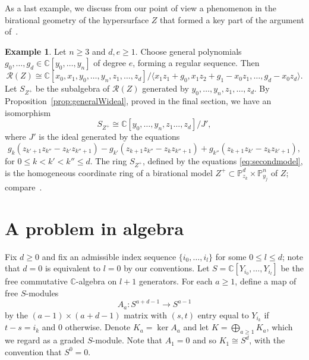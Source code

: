 \documentclass[a4paper,11pt]{amsart}
\theoremstyle{plain}
\theoremstyle{definition}
\newtheorem{example}[theorem]{Example}
\newcommand{\C}{\mathbb{C}}
\newcommand{\p}{\mathbb{P}}
\newcommand{\R}{\mathcal{R}}
\newcommand{\balazs}[1]{{\color{blue} [#1]}}
\begin{document}
As a last example, we discuss from our point of view a phenomenon in the birational geometry of the hypersurface $Z$ that formed a key part of the argument of~\cite{ottem}.

\begin{example}\label{ex:regcasemodel}
    Let $n \geq 3$ and $d,e \geq 1$. Choose general polynomials $g_0,\dots,g_d \in \C[y_0,\dots,y_n]$ of degree $e$, forming a regular sequence. Then
    \[
    \R(Z) \cong \C[x_0,x_1,y_0,\dots,y_n,z_1,\dots,z_d]/\langle x_1 z_1 + g_0, x_1 z_2 + g_1 - x_0 z_1,\ldots, g_d - x_0 z_d\rangle.
    \]
    Let $S_{Z^+}$ be the subalgebra of $\R(Z)$ generated by $y_0,\dots,y_n,z_1,\dots,z_d$. By Proposition~\ref{prop:generalWideal}, proved in the final section, we have an isomorphism
    \[
    S_{Z^+} \cong \C[y_0,\dots,y_n,z_1\dots,z_d]/J',
    \]
    where $J'$ is the ideal generated by the equations
    \begin{equation} \label{eq:secondmodel}
     g_{k} (z_{k'+1} z_{k''} - z_{k'} z_{k''+1}) - g_{k'} (z_{k+1} z_{k''} - z_k z_{k''+1}) + g_{k''} (z_{k+1} z_{k'} - z_k z_{k'+1}),
    \end{equation}
    for $0 \leq k < k' < k'' \leq d$. The ring $S_{Z^+}$, defined by the equations \eqref{eq:secondmodel}, is the homogeneous coordinate ring of a birational model $Z^+ \subset \p^d_{z_k} \times \p^n_{y_j}$ of $Z$; compare~\cite[Section 2]{ottem}.
\end{example}


\section{A problem in algebra}


Fix $d \geq 0$ and fix an admissible index sequence $\{i_0,\ldots, i_l\}$ for some $0 \leq l \leq d$; note that $d = 0$ is equivalent to $l = 0$ by our conventions. Let $S = \C[Y_{i_0}, \dots, Y_{i_l}]$ be the free commutative $\C$-algebra on $l+1$ generators. For each $a \geqslant 1$, define a map of free $S$-modules \[A_a : S^{a+d-1} \rightarrow S^{a-1}\] by the $(a-1) \times (a+d-1)$ matrix with $(s,t)$ entry equal to $Y_{i_k}$ if $t-s = i_k$ and $0$ otherwise. Denote $K_a=\ker A_a$ and let $K = \bigoplus_{a\geq 1} K_a$, which we regard as a graded $S$-module. Note that $A_1=0$ and so $K_1\cong S^d$, with the convention that $S^0 = 0$.
\end{document}
